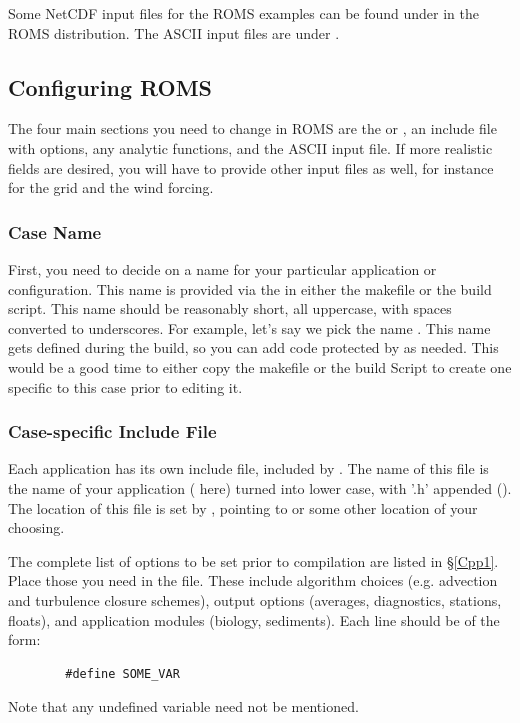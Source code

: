 Some NetCDF input files for the ROMS examples can be found under
 in the ROMS distribution. The ASCII input files are
under .

\subsection{Configuring ROMS}
\label{User}

The four main sections you need to change in ROMS are the 
or , an include file with  options, any
analytic functions, and the ASCII input file. If more realistic fields
are desired, you will have to provide other input files as well, for
instance for the grid and the wind forcing.

\subsubsection{Case Name}

First, you need to decide on a name for your particular application or
configuration. This name is provided via the  in
either the makefile or the build script. This name should be reasonably
short, all uppercase, with spaces converted to underscores. For example,
let's say we pick the name . This name gets defined
during the build, so you can add code protected by  as needed. This would be a good time to either copy the
makefile or the build Script to create one specific to this case prior
to editing it.

\subsubsection{ Case-specific Include File}

Each application has its own include file, included by
. The name of this file is the name of your
application ( here) turned into lower case, with '.h'
appended (). The location of this file is set by
, pointing to  or some other
location of your choosing.

The complete list of options to be set prior to compilation are listed in
\S\ref{Cpp1}. Place those you need in the  file. These
include algorithm choices (e.g. advection and turbulence closure schemes),
output options (averages, diagnostics, stations, floats), and
application modules (biology, sediments). Each line should be of the
form:
\begin{verbatim}
        #define SOME_VAR
\end{verbatim}
Note that any undefined variable need not be mentioned.


